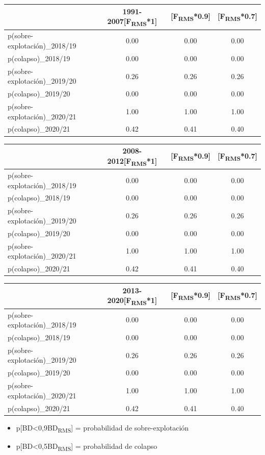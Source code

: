 \documentclass[
  spanish,
]{article}
\providecommand{\tightlist}{%
  \setlength{\itemsep}{0pt}\setlength{\parskip}{0pt}}
\begin{document}
\begin{longtable}[]{@{}lccc@{}}
\toprule
& 1991-2007{[}F\textsubscript{RMS}*1{]} & {[}F\textsubscript{RMS}*0.9{]}
& {[}F\textsubscript{RMS}*0.7{]}\tabularnewline
\midrule
\endhead
p(sobre-explotación)\_2018/19 & 0.00 & 0.00 & 0.00\tabularnewline
p(colapso)\_2018/19 & 0.00 & 0.00 & 0.00\tabularnewline
p(sobre-explotación)\_2019/20 & 0.26 & 0.26 & 0.26\tabularnewline
p(colapso)\_2019/20 & 0.00 & 0.00 & 0.00\tabularnewline
p(sobre-explotación)\_2020/21 & 1.00 & 1.00 & 1.00\tabularnewline
p(colapso)\_2020/21 & 0.42 & 0.41 & 0.40\tabularnewline
\bottomrule
\end{longtable}

\vspace{-0.7cm}

\begin{longtable}[]{@{}lccc@{}}
\toprule
& 2008-2012{[}F\textsubscript{RMS}*1{]} & {[}F\textsubscript{RMS}*0.9{]}
& {[}F\textsubscript{RMS}*0.7{]}\tabularnewline
\midrule
\endhead
p(sobre-explotación)\_2018/19 & 0.00 & 0.00 & 0.00\tabularnewline
p(colapso)\_2018/19 & 0.00 & 0.00 & 0.00\tabularnewline
p(sobre-explotación)\_2019/20 & 0.26 & 0.26 & 0.26\tabularnewline
p(colapso)\_2019/20 & 0.00 & 0.00 & 0.00\tabularnewline
p(sobre-explotación)\_2020/21 & 1.00 & 1.00 & 1.00\tabularnewline
p(colapso)\_2020/21 & 0.42 & 0.41 & 0.40\tabularnewline
\bottomrule
\end{longtable}

\vspace{-0.7cm}

\begin{longtable}[]{@{}lccc@{}}
\toprule
& 2013-2020{[}F\textsubscript{RMS}*1{]} & {[}F\textsubscript{RMS}*0.9{]}
& {[}F\textsubscript{RMS}*0.7{]}\tabularnewline
\midrule
\endhead
p(sobre-explotación)\_2018/19 & 0.00 & 0.00 & 0.00\tabularnewline
p(colapso)\_2018/19 & 0.00 & 0.00 & 0.00\tabularnewline
p(sobre-explotación)\_2019/20 & 0.26 & 0.26 & 0.26\tabularnewline
p(colapso)\_2019/20 & 0.00 & 0.00 & 0.00\tabularnewline
p(sobre-explotación)\_2020/21 & 1.00 & 1.00 & 1.00\tabularnewline
p(colapso)\_2020/21 & 0.42 & 0.41 & 0.40\tabularnewline
\bottomrule
\end{longtable}

\vspace{-0.7cm}
\scriptsize

\begin{itemize}
\tightlist
\item
  p{[}BD\textless0,9BD\textsubscript{RMS}{]} = probabilidad de
  sobre-explotación
\item
  p{[}BD\textless0,5BD\textsubscript{RMS}{]} = probabilidad de colapso
\end{itemize}
\end{document}
